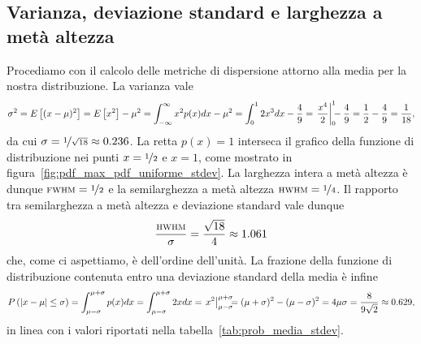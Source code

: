 

\subsection{Varianza, deviazione standard e larghezza a metà altezza}

Procediamo con il calcolo delle metriche di dispersione attorno alla media per
la nostra distribuzione. La varianza vale
\begin{align*}
  \sigma^2 = \expect{(x - \mu)^2} = \expect{x^2} - \mu^2 =
  \int_{-\infty}^{\infty}x^2p(x)dx - \mu^2 =
  \int_{0}^{1} 2x^3dx - \frac{4}{9} = \eval{\frac{x^4}{2}}{0}{1} - \frac{4}{9} =
  \frac{1}{2} - \frac{4}{9} = \frac{1}{18},
\end{align*}
da cui $\sigma = \nicefrac{1}{\sqrt{18}} \approx 0.236$. La retta $p(x) = 1$
interseca il grafico della funzione di distribuzione nei punti
$x = \nicefrac{1}{2}$ e $x = 1$, come mostrato in
figura~\ref{fig:pdf_max_pdf_uniforme_stdev}. La larghezza intera a metà
altezza è dunque ${\scriptstyle \textsc{FWHM}} = \nicefrac{1}{2}$ e la semilarghezza a metà
altezza ${\scriptstyle \textsc{HWHM}} = \nicefrac{1}{4}$. Il rapporto tra semilarghezza a metà
altezza e deviazione standard vale dunque
\begin{align*}
  \frac{{\scriptstyle \textsc{HWHM}}}{\sigma} = \frac{\sqrt{18}}{4} \approx 1.061
\end{align*}
che, come ci aspettiamo, è dell'ordine dell'unità. La frazione della
funzione di distribuzione contenuta entro una deviazione standard della media
è infine
\begin{align*}
  \prob{\abs{x - \mu} \leq \sigma} = \int_{\mu - \sigma}^{\mu + \sigma} p(x)dx =
  \int_{\mu - \sigma}^{\mu + \sigma} 2x dx = \eval{x^2}{\mu - \sigma}{\mu + \sigma}
  \;\;\;\; = (\mu + \sigma)^2 - (\mu - \sigma)^2 = 4\mu\sigma =
  \frac{8}{9\sqrt{2}} \approx 0.629,
\end{align*}
in linea con i valori riportati nella tabella~\ref{tab:prob_media_stdev}.

